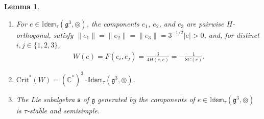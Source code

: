 \documentclass [leqno, 10pt]{amsart}
\newtheorem{lemma}[theorem]{Lemma}%
\theoremstyle{definition}
\numberwithin{equation}{section}
\newcommand{\idem}{\mathbb{Idem}}
\newcommand{\tmlt}{\circledcirc}
\newcommand{\g}{\mathfrak{g}}
\newcommand{\com}{\mathbb C}
\newcommand{\crtnt}{\mathrm{Crit}^*}
\newcommand{\norm}[1]{\lVert #1\rVert}
\newcommand{\nnorm}[1]{\lvert #1\rvert}%
\newcommand{\subs}{\mathfrak{s}}
\begin{document}
\begin{lemma}\label{thm:idem}
\leavevmode\noindent
\begin{enumerate}[label=(\arabic*), ref=(\arabic*)]
\item\label{idem2} For $e\in \idem_{\tau}(\g^{3}, \tmlt)$, the components $e_{1}$, $e_{2}$, and $e_{3}$ are pairwise $H$-orthogonal, satisfy $\norm{e_{1}} = \norm{e_{2}} = \norm{e_{3}} = 3^{-1/2}\nnorm{e} > 0$, and, for distinct $i, j \in \{1, 2, 3\}$,
\begin{align}\label{eq:idemnorms}
 W(e) = F(e_{i}, e_{j}) =  \frac{3}{4H(e, e)} = -\frac{1}{8C(e)}.
\end{align}
\item\label{idem1} $\crtnt(W) = (\com^{\ast})^{3}\cdot \idem_{\tau}(\g^{3}, \tmlt)$.
\item\label{idem3} The Lie subalgebra $\subs$ of $\g$ generated by the components of $e \in \idem_{\tau}(\g^{3}, \tmlt)$ is $\tau$-stable and semisimple. 
\end{enumerate}
\end{lemma}
\end{document}
